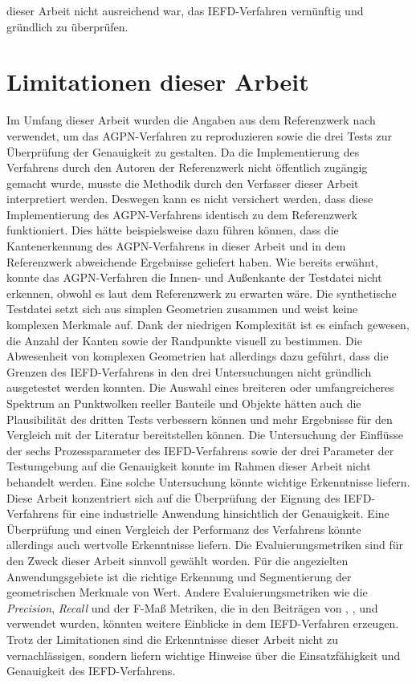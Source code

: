 dieser Arbeit nicht ausreichend war, das IEFD-Verfahren vernünftig und gründlich zu überprüfen.

\section{Limitationen dieser Arbeit}
Im Umfang dieser Arbeit wurden die Angaben aus dem Referenzwerk nach \textcite{ni_edge_2016} verwendet, um das AGPN-Verfahren zu reproduzieren sowie die drei Tests zur Überprüfung der Genauigkeit zu gestalten. Da die Implementierung des Verfahrens durch den Autoren der Referenzwerk nicht öffentlich zugängig gemacht wurde, musste die Methodik durch den Verfasser dieser Arbeit interpretiert werden. Deswegen kann es nicht versichert werden, dass diese Implementierung des AGPN-Verfahrens identisch zu dem Referenzwerk funktioniert. Dies hätte beispielsweise dazu führen können, dass die Kantenerkennung des AGPN-Verfahrens in dieser Arbeit und in dem Referenzwerk abweichende Ergebnisse geliefert haben. Wie bereits erwähnt, konnte das AGPN-Verfahren die Innen- und Außenkante der Testdatei nicht erkennen, obwohl es laut dem Referenzwerk zu erwarten wäre. Die synthetische Testdatei setzt sich aus simplen Geometrien zusammen und weist keine komplexen Merkmale auf. Dank der niedrigen Komplexität ist es einfach gewesen, die Anzahl der Kanten sowie der Randpunkte visuell zu bestimmen. Die Abwesenheit von komplexen Geometrien hat allerdings dazu geführt, dass die Grenzen des IEFD-Verfahrens in den drei Untersuchungen nicht gründlich ausgetestet werden konnten. Die Auswahl eines breiteren oder umfangreicheres Spektrum an Punktwolken reeller Bauteile und Objekte hätten auch die Plausibilität des dritten Tests verbessern können und mehr Ergebnisse für den Vergleich mit der Literatur bereitstellen können. Die Untersuchung der Einflüsse der sechs Prozessparameter des IEFD-Verfahrens sowie der drei Parameter der Testumgebung auf die Genauigkeit konnte im Rahmen dieser Arbeit nicht behandelt werden. Eine solche Untersuchung könnte wichtige Erkenntnisse liefern. Diese Arbeit konzentriert sich auf die Überprüfung der Eignung des IEFD-Verfahrens für eine industrielle Anwendung hinsichtlich der Genauigkeit. Eine Überprüfung und einen Vergleich der Performanz des Verfahrens könnte allerdings auch wertvolle Erkenntnisse liefern. Die Evaluierungsmetriken sind für den Zweck dieser Arbeit sinnvoll gewählt worden. Für die angezielten Anwendungsgebiete ist die richtige Erkennung und Segmentierung der geometrischen Merkmale von Wert. Andere Evaluierungsmetriken wie die \textit{Precision}, \textit{Recall} und der F-Maß  Metriken, die in den Beiträgen von \textcite{bazazian_edc-net_2021}, \textcite{ahmed_edge_2018}, \textcite{himeur_pcednet_2021} und \textcite{hu_jsenet_2020} verwendet wurden, könnten weitere Einblicke in dem IEFD-Verfahren erzeugen. Trotz der Limitationen sind die Erkenntnisse dieser Arbeit nicht zu vernachlässigen, sondern liefern wichtige Hinweise über die Einsatzfähigkeit und Genauigkeit des IEFD-Verfahrens.


